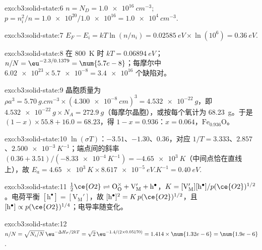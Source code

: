 \begin{solution}{exo:b3:solid-state:6}
$n = N_D = \qty{1.0e16}{cm^{-3}}$; $p = n_i^2/n = \num{1.0e20}/\num{1.0e16} = \qty{1.0e4}{cm^{-3}}$.
\end{solution}

\begin{solution}{exo:b3:solid-state:7}
$E_F - E_i = kT\ln(n/n_i) = \qty{0.02585}{eV} \times \ln(10^6) = \qty{0.36}{eV}$.
\end{solution}

\begin{solution}{exo:b3:solid-state:8}
在 \qty{800}{K} 时 $kT = \qty{0.06894}{eV}$；$n/N = \eu^{-2.3/0.1379} = \num{5.7e-8}$；每摩尔中 $\num{6.02e23} \times \num{5.7e-8} = \num{3.4e16}$
个缺陷对。
\end{solution}

\begin{solution}{exo:b3:solid-state:9}
晶胞质量为 $\rho a^3 = \qty{5.70}{g.cm^{-3}} \times (\qty{4.300e-8}{cm})^3 = \qty{4.532e-22}{g}$，即
$\qty{4.532e-22}{g} \times N_A = \qty{272.9}{g}$（每摩尔晶胞），或按每个氧计为 \qty{68.23}{g}。于是
$(1 - x) \times 55.8 + 16.0 = 68.23$，得 $1 - x = 0.936$：$x = 0.064$，$\mathrm{Fe_{0.936}O}$。
\end{solution}

\begin{solution}{exo:b3:solid-state:10}
$\ln(\sigma T)$：$-3.51$、$-1.30$、$0.36$，对应 $1/T = 3.333$、$2.857$、$\qty{2.500e-3}{K^{-1}}$；端点间的斜率
$(0.36 + 3.51)/(-\qty{8.33e-4}{K^{-1}}) = -\qty{4.65e3}{K}$（中间点恰在直线上），故
$E_a = \qty{4.65e3}{K} \times \qty{8.617e-5}{eV.K^{-1}} = \qty{0.40}{eV}$.
\end{solution}

\begin{solution}{exo:b3:solid-state:11}
$\tfrac12\ce{O2} \rightleftharpoons \mathrm{O_O^{\times} + V_M' + h^{\bullet}}$，$K = [\mathrm{V_M'}][\mathrm h^\bullet]/p(\ce{O2})^{1/2}$。电荷平衡 $[\mathrm h^\bullet] = [\mathrm{V_M'}]$，故
$[\mathrm h^\bullet]^2 = K\,p(\ce{O2})^{1/2}$，且 $[\mathrm h^\bullet] \propto p(\ce{O2})^{1/4}$；电导率随变化。
\end{solution}

\begin{solution}{exo:b3:solid-state:12}
$n/N = \sqrt{N_i/N}\,\eu^{-\Delta H_F/2kT} = \sqrt 2\,\eu^{-1.4/(2 \times 0.05170)} = 1.414 \times \num{1.32e-6} = \num{1.9e-6}$.
\end{solution}

